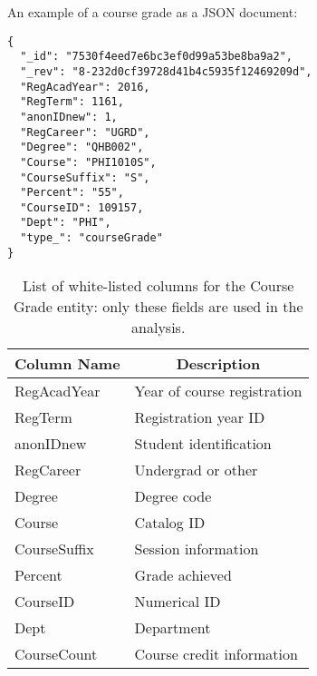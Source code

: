 An example of a course grade as a JSON document:

\begin{verbatim}
{
  "_id": "7530f4eed7e6bc3ef0d99a53be8ba9a2",
  "_rev": "8-232d0cf39728d41b4c5935f12469209d",
  "RegAcadYear": 2016,
  "RegTerm": 1161,
  "anonIDnew": 1,
  "RegCareer": "UGRD",
  "Degree": "QHB002",
  "Course": "PHI1010S",
  "CourseSuffix": "S",
  "Percent": "55",
  "CourseID": 109157,
  "Dept": "PHI",
  "type_": "courseGrade"
}
\end{verbatim}

\begin{table}[H]
  \centering
  \label{Grades Columns}
  \begin{tabular}{|l|l|}
    \hline
    \multicolumn{1}{|c|}{\textbf{Column Name}} & \multicolumn{1}{c|}{\textbf{Description}} \\
    \hline
    RegAcadYear                                & Year of course registration               \\
    RegTerm                                    & Registration year ID                      \\
    anonIDnew                                  & Student identification                    \\
    RegCareer                                  & Undergrad or other                        \\
    Degree                                     & Degree code                               \\
    Course                                     & Catalog ID                                \\
    CourseSuffix                               & Session information                       \\
    Percent                                    & Grade achieved                            \\
    CourseID                                   & Numerical ID                              \\
    Dept                                       & Department                                \\
    CourseCount                                & Course credit information                 \\
    \hline
  \end{tabular}
  \caption{List of white-listed columns for the Course Grade entity: only these fields are used in the analysis.}
\end{table}

